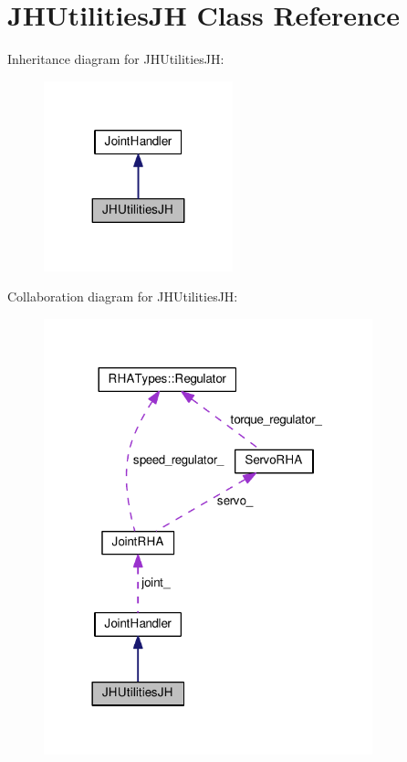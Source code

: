 \hypertarget{classJHUtilitiesJH}{}\section{J\+H\+Utilities\+JH Class Reference}
\label{classJHUtilitiesJH}


Inheritance diagram for J\+H\+Utilities\+JH\+:
\nopagebreak
\begin{figure}[H]
\begin{center}
\leavevmode
\includegraphics[width=155pt]{classJHUtilitiesJH__inherit__graph}
\end{center}
\end{figure}


Collaboration diagram for J\+H\+Utilities\+JH\+:
\nopagebreak
\begin{figure}[H]
\begin{center}
\leavevmode
\includegraphics[width=270pt]{classJHUtilitiesJH__coll__graph}
\end{center}
\end{figure}
